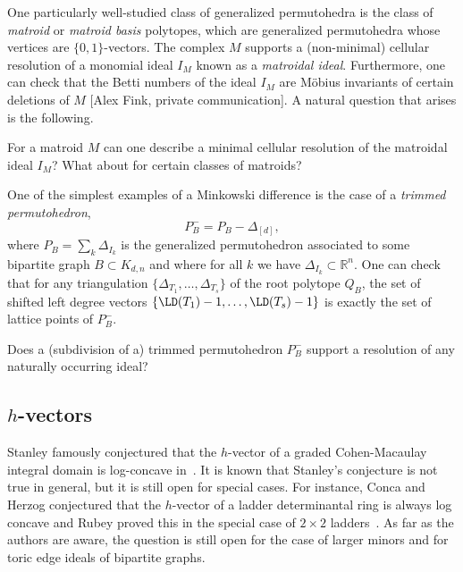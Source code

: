 One particularly well-studied class of generalized permutohedra is the class of \emph{matroid} or \textit{matroid basis} polytopes, which are generalized permutohedra whose vertices are $\{0,1\}$-vectors. 
The complex $M$ supports a (non-minimal) cellular resolution of a monomial ideal $I_M$ known as a \emph{matroidal ideal}.
Furthermore, one can check that the Betti numbers of the ideal $I_M$ are M\"obius invariants of certain deletions of $M$ [Alex Fink, private communication]. A natural question that arises is the following.

\begin{question}
For a matroid $M$ can one describe a minimal cellular resolution of the matroidal ideal $I_M$? What about for certain classes of matroids?
\end{question}

\noindent One of the simplest examples of a Minkowski difference is the case of a \emph{trimmed permutohedron},
\[P_B^- =P_B - \Delta_{[d]},\]
\noindent
where $P_B= \sum_k \Delta_{I_k}$ is the generalized permutohedron associated to some bipartite graph $B \subset K_{d,n}$ and where for all $k$ we have $\Delta_{I_k} \subset {\mathbb R}^n$. One can check~\cite[Theorem~12.9]{postnikov2009permutohedra} that for any triangulation $\{\Delta_{T_1}, \dots, \Delta_{T_s}\}$ of the root polytope $Q_B$, the set of shifted left degree vectors $\{\LD(T_1)-1, \dots, \LD(T_s)-1\}$ is exactly the set of  lattice points of $P_B^-$.

\begin{question}
Does a (subdivision of a) trimmed permutohedron $P_B^-$ support a resolution of any naturally occurring ideal?
\end{question}

\subsection{\texorpdfstring{$h$}{h}-vectors}
Stanley famously conjectured that the $h$-vector of a graded Cohen-Macaulay integral domain is log-concave in~\cite{stanley1989log}. It is known that Stanley's conjecture is not true in general, but it is still open for special cases. For instance, Conca and Herzog conjectured that the $h$-vector of a ladder determinantal ring is always log concave and Rubey proved this in the special case of $2 \times 2$ ladders~\cite{rubey2005h}.  As far as the authors are aware, the question is still open for the case of larger minors and for toric edge ideals of bipartite graphs.

